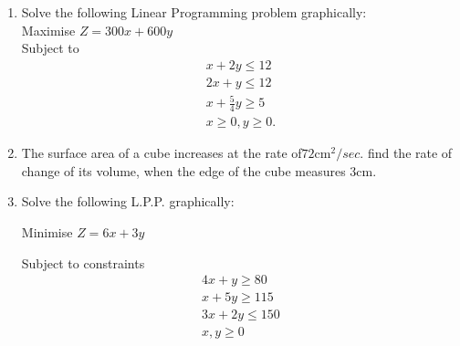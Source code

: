 \begin{enumerate}



\item Solve the following Linear Programming problem graphically:\\ Maximise $Z=300x + 600y $\\
	Subject to \begin{align}x + 2y \le 12\\
		2x + y \le 12\\
		x +\frac{5}{4}y \ge 5\\
		x \ge 0 , y \ge 0.\end{align}


\item The surface area of a cube increases at the rate of$72\mathrm{cm}^2/sec.$ find the rate of change of its volume, when the edge of the cube measures $3\mathrm{cm}.$
\item Solve the following L.P.P. graphically:

Minimise $Z = 6x + 3y$

Subject to constraints
\begin{align*}
 4x+y\geq80\\
 x+5y\geq115\\
 3x+2y\leq150\\
x,y\geq0
\end{align*}

\end{enumerate}
